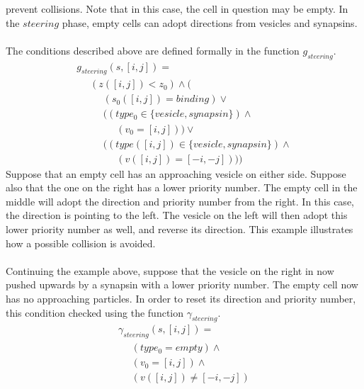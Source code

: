 \documentclass{acm_proc_article-sp}
\begin{document}
prevent collisions.  Note that in this case, the cell in 
question may be empty.  In the $steering$ phase, empty 
cells can adopt directions from vesicles and synapsins. \\
\\
The conditions described above are defined formally in 
the function $g_{steering}$.
\begin{displaymath} \begin{array}{l}
g_{steering}(s, [i, j]) = \\
\hspace{16pt} (z([i, j]) < z_0) \wedge (\\
\hspace{16pt} \hspace{16pt} (s_0([i, j]) = binding) \vee \\
\hspace{16pt} \hspace{16pt} ((type_0 \in \{ vesicle, synapsin\}) \wedge \\
\hspace{16pt} \hspace{16pt} \hspace{16pt} (v_0 = [i, j])) \vee \\
\hspace{16pt} \hspace{16pt} ((type([i, j]) \in \{ vesicle, synapsin\}) \wedge \\
\hspace{16pt} \hspace{16pt} \hspace{16pt} (v([i, j]) = [-i, -j])))
\end{array} \end{displaymath}
Suppose that an empty cell has an approaching vesicle on 
either side.  Suppose also that the one on the right has 
a lower priority number.  The empty cell in the middle will
adopt the direction and priority number from the right.  In
this case, the direction is pointing to the left.  The 
vesicle on the left will then adopt this lower priority 
number as well, and reverse its direction.  This example
illustrates how a possible collision is avoided. \\
\\
Continuing the example above, suppose that the vesicle
on the right in now pushed upwards by a synapsin with a 
lower priority number.  The empty cell now has no 
approaching particles.  In order to reset its direction
and priority number, this condition checked using the 
function $\gamma_{steering}$.
\begin{displaymath} \begin{array}{l}
\gamma_{steering}(s, [i, j]) = \\
\hspace{16pt} (type_0 = empty) \wedge \\
\hspace{16pt} (v_0 = [i, j]) \wedge \\
\hspace{16pt} (v([i, j]) \ne [-i, -j])
\end{array} \end{displaymath}
\end{document}
